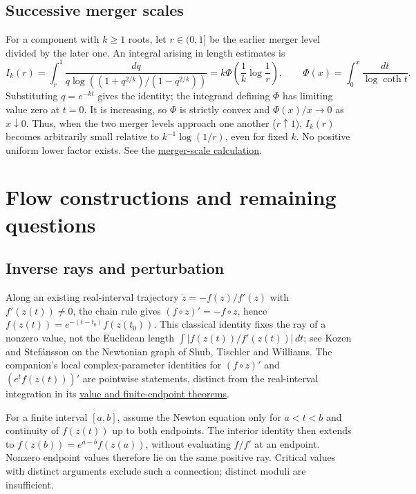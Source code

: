 \documentclass[11pt]{article}
\newcommand{\recordlink}[3]{\href{#1\##2}{#3}}
\begin{document}
\subsection{Successive merger scales}\label{sec:orlicz}
\noindent{}\label{res:orlicz-currency}
For a component with $k\ge1$ roots, let $r\in(0,1]$ be the earlier
merger level divided by the later one. An integral arising in length
estimates is
\[
 I_k(r)=\int_r^1
 \frac{dq}{q\log((1+q^{2/k})/(1-q^{2/k}))}
       =k\Phi\left(\frac1k\log\frac1r\right),
 \qquad \Phi(x)=\int_0^x\frac{dt}{\log\coth t}.
\]
Substituting $q=e^{-kt}$ gives the identity; the integrand defining
$\Phi$ has limiting value zero at $t=0$. It is increasing, so $\Phi$
is strictly convex and $\Phi(x)/x\to0$ as $x\downarrow0$.
Thus, when the two merger levels approach one another ($r\uparrow1$),
$I_k(r)$ becomes arbitrarily small relative to $k^{-1}\log(1/r)$,
even for fixed $k$. No positive uniform lower factor exists. See the
\recordlink{erdos1041-lemniscate-reasoning-surface.pdf}{merger-integral-proof}
{merger-scale calculation}.

\section{Flow constructions and remaining questions}\label{sec:open}

\subsection{Inverse rays and perturbation}\label{sec:newton}\label{sec:arguments}\label{sec:reciprocal}
\noindent{}\label{res:value}
Along an existing real-interval trajectory $\dot z=-f(z)/f'(z)$ with
$f'(z(t))\ne0$, the chain rule gives $(f\circ z)'=-f\circ z$, hence
$f(z(t))=e^{-(t-t_0)}f(z(t_0))$. This classical identity fixes the
ray of a nonzero value, not the Euclidean length
$\int|f(z(t))/f'(z(t))|\,dt$; see Kozen and Stef\'ansson
\cite[Lemmas~2.1--2.2 and \S2]{kozen-stefansson1997} on the Newtonian
graph of Shub, Tischler and Williams. The companion's local
complex-parameter identities for $(f\circ z)'$ and $(e^t f(z(t)))'$
are pointwise statements, distinct from the real-interval integration
in its \recordlink{erdos1041-lemniscate-reasoning-surface.pdf}{newton-value-proof}
{value and finite-endpoint theorems}.

\noindent{}\label{res:ray}
For a finite interval $[a,b]$, assume the Newton equation only for
$a<t<b$ and continuity of $f(z(t))$ up to both endpoints. The interior
identity then extends to $f(z(b))=e^{a-b}f(z(a))$, without evaluating
$f/f'$ at an endpoint. Nonzero endpoint values therefore lie on the
same positive ray. Critical values
with distinct arguments exclude such a connection; distinct moduli are
insufficient.
\end{document}

